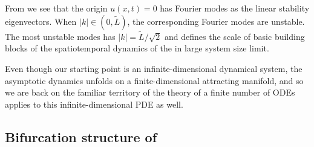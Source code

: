 From  we see that the origin $u(x,t) = 0$
has Fourier modes as the  linear
stability eigenvectors. 
When $|k| \in (0,\tilde{L})$, the corresponding Fourier modes are
unstable.
The most unstable modes has $|k|=\tilde{L}/\sqrt{2}$ 
and defines the scale of basic building
blocks of the spatiotemporal dynamics of the {\KSe} in large system size limit.



% 
% 
% 

Even though our starting point
is an infinite-dimensional dynamical system, the asymptotic dynamics
unfolds on a finite-dimensional attracting manifold, and so we are back on
the familiar territory of 
the theory of a finite number of ODEs applies to this
infinite-dimensional PDE as well.

\subsection{Bifurcation structure of \KS}
\label{sec:KSlit}
%

